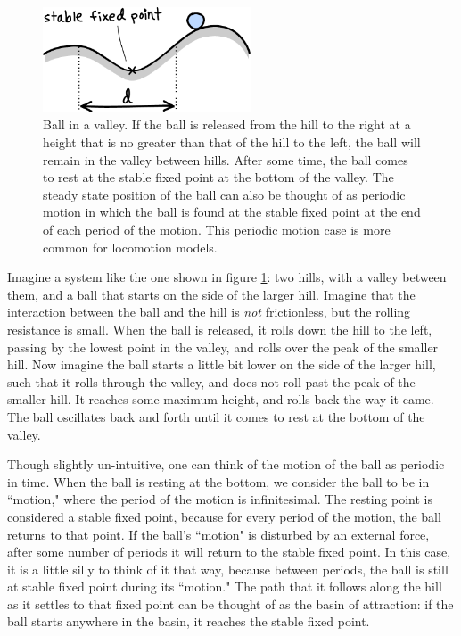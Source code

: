\begin{figure}[h]		%
\begin{centering}
\includegraphics[width=0.55\textwidth]{Figures/BallOnHill}\par
\end{centering}
\caption[Diagram: Ball in a Valley]{Ball in a valley. If the ball is released from the hill to the right at a height that is no greater than that of the hill to the left, the ball will remain in the valley between hills. After some time, the ball comes to rest at the stable fixed point at the bottom of the valley. The steady state position of the ball can also be thought of as periodic motion in which the ball is found at the stable fixed point at the end of each period of the motion. This periodic motion case is more common for locomotion models.}
\label{fig:BallOnHill}
\end{figure}
%

Imagine a system like the one shown in figure \ref{fig:BallOnHill}: two hills, with a valley between them, and a ball that starts on the side of the larger hill. Imagine that the interaction between the ball and the hill is \emph{not} frictionless, but the rolling resistance is small. When the ball is released, it rolls down the hill to the left, passing by the lowest point in the valley, and rolls over the peak of the smaller hill. Now imagine the ball starts a little bit lower on the side of the larger hill, such that it rolls through the valley, and does not roll past the peak of the smaller hill. It reaches some maximum height, and rolls back the way it came. The ball oscillates back and forth until it comes to rest at the bottom of the valley. 

Though slightly un-intuitive, one can think of the motion of the ball as periodic in time. When the ball is resting at the bottom, we consider the ball to be in ``motion," where the period of the motion is infinitesimal. The resting point is considered a stable fixed point, because for every period of the motion, the ball returns to that point. If the ball's ``motion" is disturbed by an external force, after some number of periods it will return to the stable fixed point. In this case, it is a little silly to think of it that way, because between periods, the ball is still at stable fixed point during its ``motion." The path that it follows along the hill as it settles to that fixed point can be thought of as the basin of attraction: if the ball starts anywhere in the basin, it reaches the stable fixed point. 

